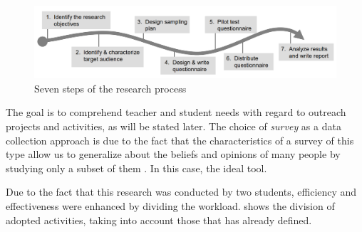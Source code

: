 
\begin{figure}[htb]
  \caption{Seven steps of the research process}\label{fig:setepassos}
  \begin{center}
    \includegraphics[width=16cm]{img/5-kasunic-process.png}
  \end{center}
\end{figure}


The goal is to comprehend teacher and student needs with regard to outreach projects and activities, as will be stated later.
The choice of \textit{survey} as a data collection approach is due to the fact that the characteristics of a survey of this type allow us to generalize about the beliefs and opinions of many people by studying only a subset of them \cite{kasunic2005designing}.
In this case, the ideal tool.


Due to the fact that this research was conducted by two students, efficiency and effectiveness were enhanced by dividing the workload.
 shows the division of adopted activities, taking into account those that  has already defined.

